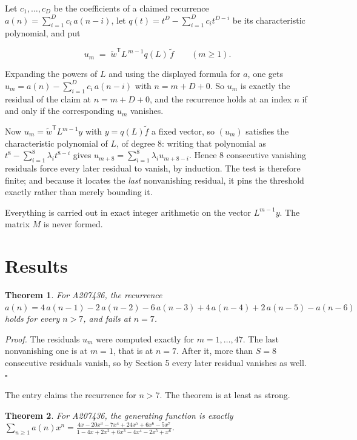 \documentclass[11pt]{article}
\newtheorem{theorem}{Theorem}
\theoremstyle{definition}
\begin{document}
Let $c_1,\dots,c_D$ be the coefficients of a claimed recurrence $a(n) = \sum_{i=1}^{D} c_i\,a(n-i)$, let $q(t) = t^{D} - \sum_{i=1}^{D} c_i t^{D-i}$ be its characteristic polynomial, and put

\[u_m \;=\; \tilde w^{\mathsf T} L^{\,m-1} q(L)\,\tilde f \qquad (m \ge 1).\]

Expanding the powers of $L$ and using the displayed formula for $a$, one gets $u_m = a(n) - \sum_{i=1}^{D} c_i\,a(n-i)$ with $n = m + D + 0$. So $u_m$ is exactly the residual of the claim at $n = m + D + 0$, and the recurrence holds at an index $n$ if and only if the corresponding $u_m$ vanishes.

Now $u_m = \tilde w^{\mathsf T} L^{m-1} y$ with $y = q(L)\tilde f$ a fixed vector, so $(u_m)$ satisfies the characteristic polynomial of $L$, of degree $8$: writing that polynomial as $t^{8} - \sum_{i=1}^{8} \lambda_i t^{8-i}$ gives $u_{m+8} = \sum_{i=1}^{8} \lambda_i u_{m+8-i}$. Hence $8$ consecutive vanishing residuals force every later residual to vanish, by induction. The test is therefore finite; and because it locates the {\itshape last} nonvanishing residual, it pins the threshold exactly rather than merely bounding it.

Everything is carried out in exact integer arithmetic on the vector $L^{m-1}y$. The matrix $M$ is never formed.

\section{Results}

\begin{theorem} For A207436, the recurrence $a(n) = 4\,a(n-1) - 2\,a(n-2) - 6\,a(n-3) + 4\,a(n-4) + 2\,a(n-5) - a(n-6)$ holds for every $n > 7$, and fails at $n = 7$.\end{theorem}

{\itshape Proof.} The residuals $u_m$ were computed exactly for $m = 1,\dots,47$. The last nonvanishing one is at $m = 1$, that is at $n = 7$. After it, more than $S = 8$ consecutive residuals vanish, so by Section 5 every later residual vanishes as well. $\square$

The entry claims the recurrence for $n > 7$. The theorem is at least as strong.

\begin{theorem} For A207436, the generating function is exactly $\sum_{n\ge 1} a(n)x^n = \frac{4x - 20x^{3} - 7x^{4} + 24x^{5} + 6x^{6} - 5x^{7}}{1 - 4x + 2x^{2} + 6x^{3} - 4x^{4} - 2x^{5} + x^{6}}$.\end{theorem}
\end{document}
